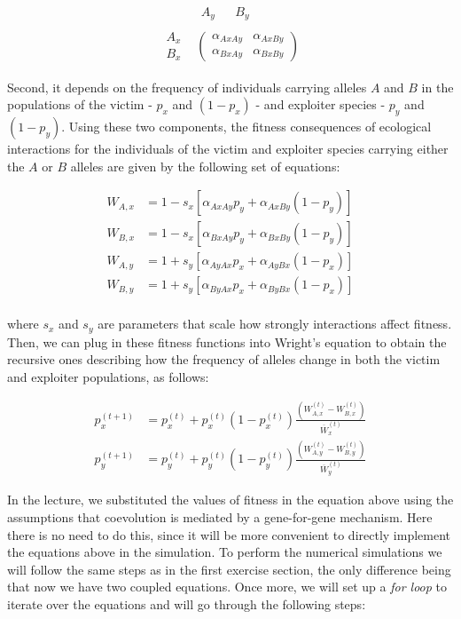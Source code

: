 \documentclass[
]{book}
\begin{document}
\[
\begin{array}{cc} &
\begin{array}{cc} A_{y} && B_{y} \end{array}
\\
\begin{array}{cc}
A_{x} \\
B_{x} \end{array}
&
\left(
\begin{array}{cc}
\alpha_{AxAy} & \alpha_{AxBy} \\
\alpha_{BxAy} & \alpha_{BxBy} \end{array}
\right)\end{array}
\]

Second, it depends on the frequency of individuals carrying alleles \(A\) and \(B\) in the populations of the victim - \(p_{x}\) and \((1-p_{x})\) - and exploiter species - \(p_{y}\) and \((1-p_{y})\). Using these two components, the fitness consequences of ecological interactions for the individuals of the victim and exploiter species carrying either the \(A\) or \(B\) alleles are given by the following set of equations:

\[\begin{aligned}
W_{A,x}&=1-s_{x}\left[\alpha_{AxAy}p_{y}+\alpha_{AxBy}(1-p_{y})\right] \\
W_{B,x}&=1-s_{x}\left[\alpha_{BxAy}p_{y}+\alpha_{BxBy}(1-p_{y})\right] \\
W_{A,y}&=1+s_{y}\left[\alpha_{AyAx}p_{x}+\alpha_{AyBx}(1-p_{x})\right] \\
W_{B,y}&=1+s_{y}\left[\alpha_{ByAx}p_{x}+\alpha_{ByBx}(1-p_{x})\right] \\
\end{aligned}\]

where \(s_{x}\) and \(s_{y}\) are parameters that scale how strongly interactions affect fitness. Then, we can plug in these fitness functions into Wright's equation to obtain the recursive ones describing how the frequency of alleles change in both the victim and exploiter populations, as follows:

\[\begin{aligned}
p_{x}^{(t+1)}&=p_{x}^{(t)}+p_{x}^{(t)}(1-p_{x}^{(t)})\frac{\left(W_{A,x}^{(t)}-W_{B,x}^{(t)}\right)}{\overline{W}_{x}^{(t)}} \\
p_{y}^{(t+1)}&=p_{y}^{(t)}+p_{y}^{(t)}(1-p_{y}^{(t)})\frac{\left(W_{A,y}^{(t)}-W_{B,y}^{(t)}\right)}{\overline{W}_{y}^{(t)}}\end{aligned}\]

In the lecture, we substituted the values of fitness in the equation above using the assumptions that coevolution is mediated by a gene-for-gene mechanism. Here there is no need to do this, since it will be more convenient to directly implement the equations above in the simulation. To perform the numerical simulations we will follow the same steps as in the first exercise section, the only difference being that now we have two coupled equations. Once more, we will set up a \emph{for loop} to iterate over the equations and will go through the following steps:
\end{document}
